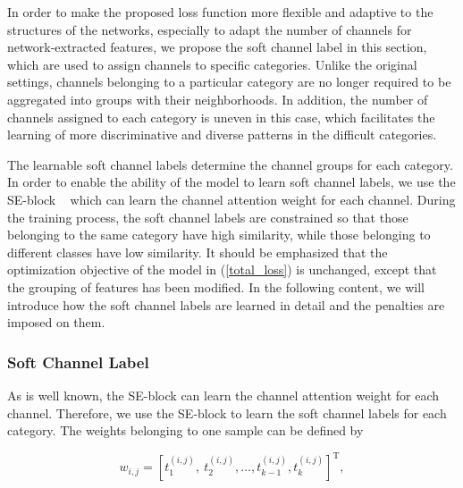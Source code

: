 \documentclass[journal]{IEEEtran}
\begin{document}
In order to make the proposed loss function more flexible and adaptive to the structures of the networks, especially to adapt the number of channels for network-extracted features, we propose the soft channel label in this section, which are used to assign channels to specific categories. Unlike the original settings, channels belonging to a particular category are no longer required to be aggregated into groups with their neighborhoods. In addition, the number of channels assigned to each category is uneven  in this case, which facilitates the learning of more discriminative and diverse patterns  in  the difficult categories. 

The learnable soft channel labels determine the channel groups for each category. In order to enable the ability of the model to learn soft channel labels, we use the SE-block ~\cite{hu2018squeeze} which can learn the channel attention weight for each channel. During the training process, the soft channel labels are constrained so that those belonging to the same category have high similarity, while those belonging to different classes have low similarity. 
It should be emphasized that the optimization objective of the model in (\ref{total_loss}) is unchanged, except that the grouping of features has been modified. In the following content, we will introduce how the soft channel labels are learned in detail and the penalties are imposed on them.






















\subsubsection{Soft Channel Label}\label{channelsoftlabel}


As is well known, the SE-block can learn the channel attention weight for each channel. Therefore, we use the SE-block to learn the soft channel  labels for each category. The weights belonging to one sample can be defined by









\begin{small}
\begin{equation}
w_{i,j}=\left[t_{1}^{(i,j)},\ t_{2}^{(i,j)},...,t_{k-1}^{(i,j)},t_{k}^{(i,j)}\right]^\text{T},
    \label{mcloss}
\end{equation}
\end{small}
\end{document}
